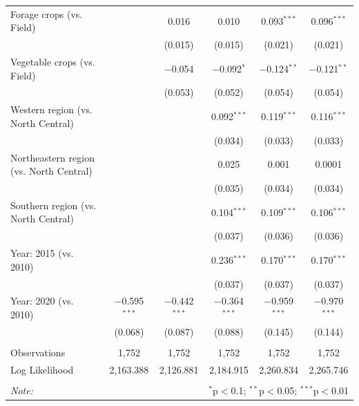 \begin{table}[!h]
\begin{tabular}{@{\extracolsep{5pt}}lccccc}
  Forage crops (vs. Field) &  & 0.016 & 0.010 & 0.093$^{***}$ & 0.096$^{***}$ \\ 
  &  & (0.015) & (0.015) & (0.021) & (0.021) \\ 
  Vegetable crops (vs. Field) &  & $-$0.054 & $-$0.092$^{*}$ & $-$0.124$^{**}$ & $-$0.121$^{**}$ \\ 
  &  & (0.053) & (0.052) & (0.054) & (0.054) \\ 
  Western region (vs. North Central) &  &  & 0.092$^{***}$ & 0.119$^{***}$ & 0.116$^{***}$ \\ 
  &  &  & (0.034) & (0.033) & (0.033) \\ 
  Northeastern region (vs. North Central) &  &  & 0.025 & 0.001 & 0.0001 \\ 
  &  &  & (0.035) & (0.034) & (0.034) \\ 
  Southern region (vs. North Central) &  &  & 0.104$^{***}$ & 0.109$^{***}$ & 0.106$^{***}$ \\ 
  &  &  & (0.037) & (0.036) & (0.036) \\ 
  Year: 2015 (vs. 2010) &  &  & 0.236$^{***}$ & 0.170$^{***}$ & 0.170$^{***}$ \\ 
  &  &  & (0.037) & (0.037) & (0.037) \\ 
  Year: 2020 (vs. 2010) & $-$0.595$^{***}$ & $-$0.442$^{***}$ & $-$0.364$^{***}$ & $-$0.959$^{***}$ & $-$0.970$^{***}$ \\ 
  & (0.068) & (0.087) & (0.088) & (0.145) & (0.144) \\ 
 \hline \\[-1.8ex] 
Observations & 1,752 & 1,752 & 1,752 & 1,752 & 1,752 \\ 
Log Likelihood & 2,163.388 & 2,126.881 & 2,184.915 & 2,260.834 & 2,265.746 \\ 
\hline 
\hline \\[-1.8ex] 
\textit{Note:}  & \multicolumn{5}{r}{$^{*}$p$<$0.1; $^{**}$p$<$0.05; $^{***}$p$<$0.01} \\ 
\end{tabular} 
\end{table} 
